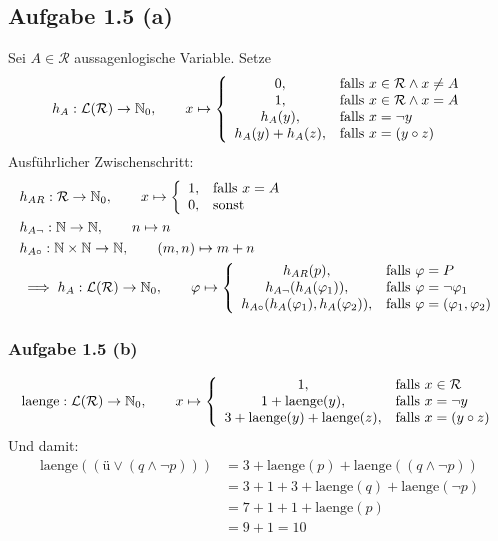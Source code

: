 \subsection*{Aufgabe 1.5 (a)}
Sei $A\in\mathcal{R}$ aussagenlogische Variable. Setze
\begin{align*}
	h_A:\mathcal{L}(\mathcal{R})\to\mathbb{N}_0,\qquad x\mapsto \left\lbrace\begin{array}{cl}
		0, & \text{falls } x\in\mathcal{R}\wedge x\neq A\\
		1, & \text{falls } x\in\mathcal{R}\wedge x=A\\
		h_A(y), & \text{falls } x=\neg y\\
		h_A(y)+h_A(z), & \text{falls } x=(y\circ z)
	\end{array}\right.
\end{align*}
Ausführlicher Zwischenschritt:
\begin{align*}
	&h_{AR}:\mathcal{R}\to\mathbb{N}_0,\qquad x\mapsto \left\lbrace\begin{array}{cl}
		1, & \text{falls } x= A\\
		0, & \text{sonst }
	\end{array}\right.\\
	&h_{A\neg}:\mathbb{N}\to\mathbb{N},\qquad n\mapsto n\\
	&h_{A\circ}:\mathbb{N}\times\mathbb{N}\to\mathbb{N},\qquad(m,n)\mapsto m+n\\
	&\implies h_A:\mathcal{L}(\mathcal{R})\to\mathbb{N}_0,\qquad\varphi\mapsto
	\left\lbrace\begin{array}{cl}
		h_{AR}(p), & \text{falls } \varphi=P\\
		h_{A\neg}(h_A(\varphi_1)), & \text{falls } \varphi=\neg\varphi_1\\
		h_{A\circ}(h_A(\varphi_1),h_A(\varphi_2)), &\text{falls } \varphi=(\varphi_1,\varphi_2)
	\end{array}\right.
\end{align*}

\subsubsection{Aufgabe 1.5 (b)}
\begin{align*}
	\text{laenge}:\mathcal{L}(\mathcal{R})\to\mathbb{N}_0,\qquad x\mapsto \left\lbrace\begin{array}{cl}
		1, & \text{falls } x\in\mathcal{R}\\
		1+\text{laenge}(y), & \text{falls } x=\neg y\\
		3+\text{laenge}(y)+\text{laenge}(z), & \text{falls } x=(y\circ z)
	\end{array}\right.
\end{align*}
Und damit:
\begin{align*}
	\text{laenge}((ü\vee(q\wedge\neg p))) 
	&=3+\text{laenge}(p)+\text{laenge}((q\wedge\neg p))\\
	&=3+1+3+\text{laenge}(q)+\text{laenge}(\neg p)\\
	&=7 + 1 + 1+ \text{laenge}(p)\\
	&=9+1=10
\end{align*}

